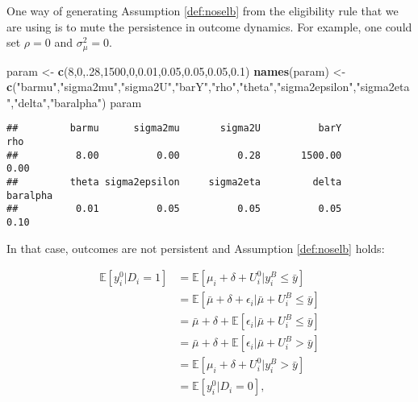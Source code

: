 \documentclass[]{book}
\newenvironment{Shaded}{\begin{snugshade}}{\end{snugshade}}
\newcommand{\DecValTok}[1]{\textcolor[rgb]{0.00,0.00,0.81}{#1}}
\newcommand{\FloatTok}[1]{\textcolor[rgb]{0.00,0.00,0.81}{#1}}
\newcommand{\KeywordTok}[1]{\textcolor[rgb]{0.13,0.29,0.53}{\textbf{#1}}}
\newcommand{\NormalTok}[1]{#1}
\newcommand{\StringTok}[1]{\textcolor[rgb]{0.31,0.60,0.02}{#1}}
\newcommand{\esp}[1]{\mathbb{E}[ #1 ]}
\theoremstyle{definition}
\theoremstyle{definition}
\theoremstyle{definition}
\theoremstyle{remark}
\begin{document}
One way of generating Assumption \ref{def:noselb} from the eligibility rule that we are using is to mute the persistence in outcome dynamics.
For example, one could set \(\rho=0\) and \(\sigma^2_{\mu}=0\).

\begin{Shaded}
\begin{Highlighting}[]
\NormalTok{param <-}\StringTok{ }\KeywordTok{c}\NormalTok{(}\DecValTok{8}\NormalTok{,}\DecValTok{0}\NormalTok{,.}\DecValTok{28}\NormalTok{,}\DecValTok{1500}\NormalTok{,}\DecValTok{0}\NormalTok{,}\FloatTok{0.01}\NormalTok{,}\FloatTok{0.05}\NormalTok{,}\FloatTok{0.05}\NormalTok{,}\FloatTok{0.05}\NormalTok{,}\FloatTok{0.1}\NormalTok{)}
\KeywordTok{names}\NormalTok{(param) <-}\StringTok{ }\KeywordTok{c}\NormalTok{(}\StringTok{"barmu"}\NormalTok{,}\StringTok{"sigma2mu"}\NormalTok{,}\StringTok{"sigma2U"}\NormalTok{,}\StringTok{"barY"}\NormalTok{,}\StringTok{"rho"}\NormalTok{,}\StringTok{"theta"}\NormalTok{,}\StringTok{"sigma2epsilon"}\NormalTok{,}\StringTok{"sigma2eta"}\NormalTok{,}\StringTok{"delta"}\NormalTok{,}\StringTok{"baralpha"}\NormalTok{)}
\NormalTok{param}
\end{Highlighting}
\end{Shaded}

\begin{verbatim}
##         barmu      sigma2mu       sigma2U          barY           rho 
##          8.00          0.00          0.28       1500.00          0.00 
##         theta sigma2epsilon     sigma2eta         delta      baralpha 
##          0.01          0.05          0.05          0.05          0.10
\end{verbatim}

In that case, outcomes are not persistent and Assumption \ref{def:noselb} holds:

\begin{align*}
\esp{y_i^0|D_i=1} & = \esp{\mu_i+\delta+U_i^0|y_i^B\leq\bar{y}}\\
                  & = \esp{\bar{\mu}+\delta+\epsilon_i|\bar{\mu}+U_i^B\leq\bar{y}}\\
                  & = \bar{\mu} + \delta + \esp{\epsilon_i|\bar{\mu}+U_i^B\leq\bar{y}}\\
                  & = \bar{\mu} + \delta + \esp{\epsilon_i|\bar{\mu}+U_i^B>\bar{y}}\\
                  & = \esp{\mu_i+\delta+U_i^0|y_i^B>\bar{y}}\\
                  & = \esp{y_i^0|D_i=0},                  
\end{align*}
\end{document}
